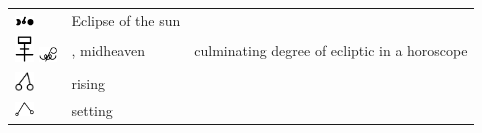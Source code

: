 \documentclass[british,final,landscape]{scrartcl}
\begin{document}
\begin{refsection}
\begin{supertabular}{p{0.3\textwidth}p{0.34\textwidth}p{0.34\textwidth}}
  \includegraphics[width=5mm]{Astrology/EclipseSun} & Eclipse of the sun & \\
  \includegraphics[width=5mm]{Astrology/MediumCoeli} \includegraphics[width=5mm]{Astrology/MediumCoeli2} & , midheaven & culminating degree of ecliptic in a horoscope \\
  \includegraphics[width=5mm]{Astrology/Rising} & rising & \\
  \includegraphics[width=5mm]{Astrology/Setting} & setting & \\

\end{supertabular}
\end{refsection}
\end{document}
